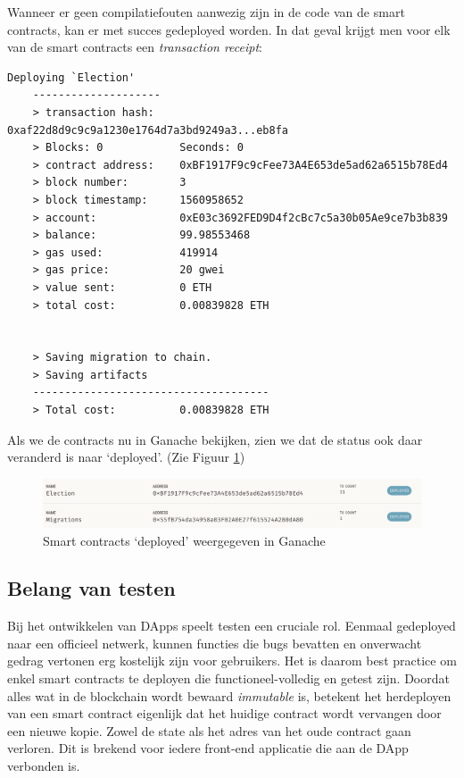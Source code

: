 	Wanneer er geen compilatiefouten aanwezig zijn in de code van de smart contracts, kan er met succes gedeployed worden. In dat geval krijgt men voor elk van de smart contracts een \textit{transaction receipt}:
	\lstset{language=bash}
	\begin{lstlisting}[numbers=none]
	 Deploying `Election'
	--------------------
	> transaction hash:    0xaf22d8d9c9c9a1230e1764d7a3bd9249a3...eb8fa
	> Blocks: 0            Seconds: 0
	> contract address:    0xBF1917F9c9cFee73A4E653de5ad62a6515b78Ed4
	> block number:        3
	> block timestamp:     1560958652
	> account:             0xE03c3692FED9D4f2cBc7c5a30b05Ae9ce7b3b839
	> balance:             99.98553468
	> gas used:            419914
	> gas price:           20 gwei
	> value sent:          0 ETH
	> total cost:          0.00839828 ETH
	
	
	> Saving migration to chain.
	> Saving artifacts
	-------------------------------------
	> Total cost:          0.00839828 ETH
	\end{lstlisting}
	
	Als we de contracts nu in Ganache bekijken, zien we dat de status ook daar veranderd is naar `deployed'. (Zie Figuur \ref{fig:contracts-ganache2})
	
	\begin{figure}
		\includegraphics[width=\linewidth]{img/contracts-ganache2.png}
		\caption{Smart contracts `deployed' weergegeven in Ganache}
		\label{fig:contracts-ganache2}
	\end{figure}
	
	\subsection{Belang van testen}
	Bij het ontwikkelen van DApps speelt testen een cruciale rol. Eenmaal gedeployed naar een officieel netwerk, kunnen functies die bugs bevatten en onverwacht gedrag vertonen erg kostelijk zijn voor gebruikers. Het is daarom best practice om enkel smart contracts te deployen die functioneel-volledig en getest zijn.  Doordat alles wat in de blockchain wordt bewaard \textit{immutable} is, betekent het herdeployen van een smart contract eigenlijk dat het huidige contract wordt vervangen door een nieuwe kopie. Zowel de state als het adres van het oude contract gaan verloren. Dit is brekend voor iedere front-end applicatie die aan de DApp verbonden is. 
	
